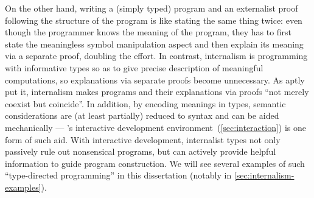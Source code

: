 On the other hand, writing a (simply typed) program and an externalist proof following the structure of the program is like stating the same thing twice: even though the programmer knows the meaning of the program, they has to first state the meaningless symbol manipulation aspect and then explain its meaning via a separate proof, doubling the effort.
In contrast, internalism is programming with informative types so as to give precise description of meaningful computations, so explanations via separate proofs become unnecessary.
As \citet{McBride-Epigram} aptly put it, internalism makes programs and their explanations via proofs ``not merely coexist but coincide''.
In addition, by encoding meanings in types, semantic considerations are (at least partially) reduced to syntax and can be aided mechanically --- \Agda's interactive development environment~(\autoref{sec:interaction}) is one form of such aid.
With interactive development, internalist types not only passively rule out nonsensical programs, but can actively provide helpful information to guide program construction.
We will see several examples of such ``type-directed programming'' in this dissertation (notably in \autoref{sec:internalism-examples}).


